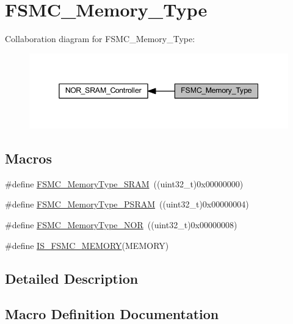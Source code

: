 \hypertarget{group___f_s_m_c___memory___type}{}\section{F\+S\+M\+C\+\_\+\+Memory\+\_\+\+Type}
\label{group___f_s_m_c___memory___type}
Collaboration diagram for F\+S\+M\+C\+\_\+\+Memory\+\_\+\+Type\+:
\nopagebreak
\begin{figure}[H]
\begin{center}
\leavevmode
\includegraphics[width=345pt]{group___f_s_m_c___memory___type}
\end{center}
\end{figure}
\subsection*{Macros}
\begin{DoxyCompactItemize}
\item 
\#define \hyperlink{group___f_s_m_c___memory___type_ga8a24e8da42e67dcf6fb2f43659aa49cf}{F\+S\+M\+C\+\_\+\+Memory\+Type\+\_\+\+S\+R\+AM}~((uint32\+\_\+t)0x00000000)
\item 
\#define \hyperlink{group___f_s_m_c___memory___type_gae3e680998b2fee8d56222634f5268a75}{F\+S\+M\+C\+\_\+\+Memory\+Type\+\_\+\+P\+S\+R\+AM}~((uint32\+\_\+t)0x00000004)
\item 
\#define \hyperlink{group___f_s_m_c___memory___type_ga8b9390abe7c281947c550bf4365649e5}{F\+S\+M\+C\+\_\+\+Memory\+Type\+\_\+\+N\+OR}~((uint32\+\_\+t)0x00000008)
\item 
\#define \hyperlink{group___f_s_m_c___memory___type_ga255cd500e141f4ac024cf5f896921233}{I\+S\+\_\+\+F\+S\+M\+C\+\_\+\+M\+E\+M\+O\+RY}(M\+E\+M\+O\+RY)
\end{DoxyCompactItemize}


\subsection{Detailed Description}


\subsection{Macro Definition Documentation}
\mbox{\label{group___f_s_m_c___memory___type_ga8b9390abe7c281947c550bf4365649e5}} 
